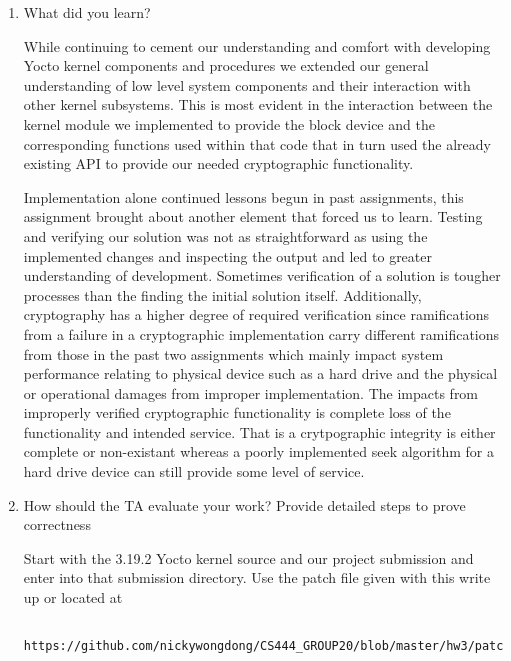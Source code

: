\documentclass[onecolumn, draftclsnofoot,10pt, compsoc]{IEEEtran}
\begin{document}
\begin{enumerate}
\begin{singlespace}
 
    \end{singlespace}
    
    \item What did you learn?
    \begin{singlespace} 
    While continuing to cement our understanding and comfort with developing Yocto kernel components and procedures we extended our general understanding of low level system components and their interaction with other kernel subsystems. This is most evident in the interaction between the kernel module we implemented to provide the block device and the corresponding functions used within that code that in turn used the already existing API to provide our needed cryptographic functionality.
    
   \quad Implementation alone continued lessons begun in past assignments, this assignment brought about another element that forced us to learn. Testing and verifying our solution was not as straightforward as using the implemented changes and inspecting the output and led to greater understanding of development. Sometimes verification of a solution is tougher processes than the finding the initial solution itself. Additionally, cryptography has a higher degree of required verification since ramifications from a failure in a cryptographic implementation carry different ramifications from those in the past two assignments which mainly impact system performance relating to physical device such as a hard drive and the physical or operational damages from improper implementation. The impacts from improperly verified cryptographic functionality is complete loss of the functionality and intended service. That is a crytpographic integrity is either complete or non-existant whereas a poorly implemented seek algorithm for a hard drive device can still provide some level of service. 


    \end{singlespace}
    \item How should the TA evaluate your work? Provide detailed steps to prove correctness
    \begin{singlespace}
    Start with the 3.19.2 Yocto kernel source and our project submission and enter into that submission directory. Use the patch file given with this write up or located at 
    \end{singlespace}
    \begin{lstlisting}
    https://github.com/nickywongdong/CS444_GROUP20/blob/master/hw3/patch/hw3.patch
    \end{lstlisting}

\end{enumerate}
\end{document}
